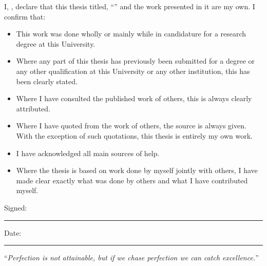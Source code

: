 \documentclass[
11pt, %
english, %
singlespacing, %
headsepline, %
]{MastersDoctoralThesis} %
\begin{document}

\begin{declaration}
\addchaptertocentry{\authorshipname}

\noindent I, \authorname, declare that this thesis titled, \enquote{\ttitle} and the work presented in it are my own. I confirm that:

\begin{itemize} 
\item This work was done wholly or mainly while in candidature for a research degree at this University.
\item Where any part of this thesis has previously been submitted for a degree or any other qualification at this University or any other institution, this has been clearly stated.
\item Where I have consulted the published work of others, this is always clearly attributed.
\item Where I have quoted from the work of others, the source is always given. With the exception of such quotations, this thesis is entirely my own work.
\item I have acknowledged all main sources of help.
\item Where the thesis is based on work done by myself jointly with others, I have made clear exactly what was done by others and what I have contributed myself.\\
\end{itemize}
 
\noindent Signed:\\
\rule[0.5em]{25em}{0.5pt} %
 
\noindent Date:\\
\rule[0.5em]{25em}{0.5pt} %
\end{declaration}

\cleardoublepage


\vspace*{0.2\textheight}

\noindent\enquote{\itshape Perfection is not attainable, but if we chase perfection we can catch excellence.}\bigbreak
\end{document}
